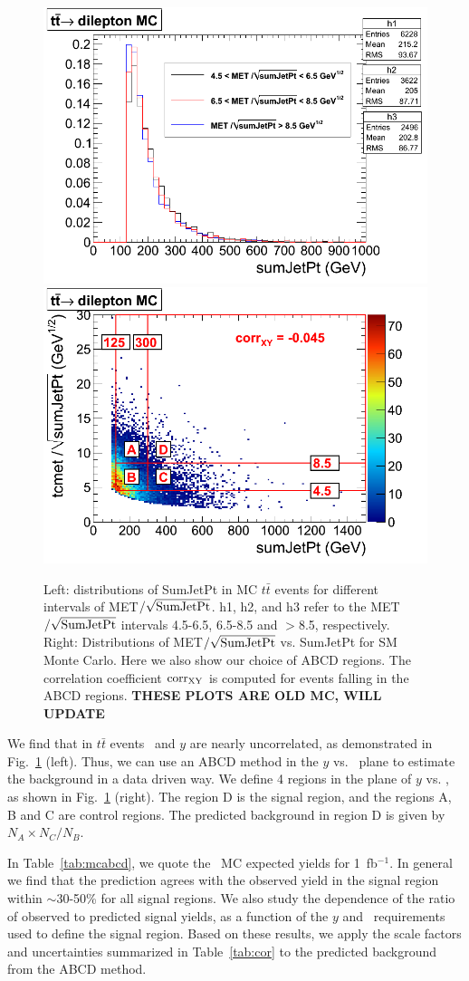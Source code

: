 \begin{figure}[hbt]
\begin{center}
\includegraphics[width=0.48\linewidth]{uncor.png}
\includegraphics[width=0.48\linewidth]{ttdil_uncor_38X.png}
\caption{\label{fig:uncor}\protect 
Left: distributions of SumJetPt 
in MC $t\bar{t}$ events for different intervals of 
MET$/\sqrt{\rm SumJetPt}$. h1, h2, and h3 refer to the MET$/\sqrt{\rm SumJetPt}$
intervals 4.5-6.5, 6.5-8.5 and $>$8.5, respectively. Right: 
Distributions of MET$/\sqrt{\rm SumJetPt}$ vs. 
SumJetPt for SM Monte Carlo.  Here we also show our choice of ABCD regions. The correlation coefficient
${\rm corr_{XY}}$ is computed for events falling in the ABCD regions.
{\bf THESE PLOTS ARE OLD MC, WILL UPDATE}
}
\end{center}
\end{figure}

We find that in $t\bar{t}$ events \Ht\ and 
$y$ are nearly uncorrelated, 
as demonstrated in Fig.~\ref{fig:uncor} (left).
Thus, we can use an ABCD method in the $y$ vs. \Ht\
plane to estimate the background in a data driven way. We define 4 regions in the 
plane of $y$ vs. \Ht, as shown in Fig.~\ref{fig:uncor} (right).
The region D is the signal region, and the regions A, B and C are control regions.
The predicted background in region D is given by $N_A \times N_C / N_B$.

In Table~\ref{tab:mcabcd}, we quote the \ttbar\ MC expected yields for 1~fb$^{-1}$. In
general we find that the prediction agrees with the observed yield in the signal region within
$\sim$30-50\% for all signal regions. We also study the dependence of the ratio
of observed to predicted signal yields, as a function of the $y$ and \Ht\
requirements used to define the signal region.
Based on these results, we apply the
scale factors and uncertainties summarized in Table~\ref{tab:cor} to the
predicted background from the ABCD method.


